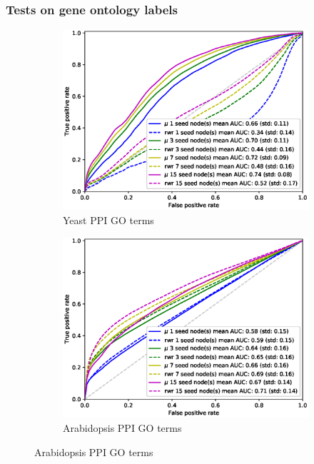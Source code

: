 \documentclass[sigconf]{acmart}
\begin{document}
\subsubsection{Tests on gene ontology labels}
\begin{figure}[]
     \centering
    \begin{subfigure}[b]{0.31\textwidth}
        \centering
        \includegraphics[width=\textwidth]{images/rocs/yeast_ppi_amigo.eps}
        \caption{Yeast PPI GO terms}
    \end{subfigure}
    \begin{subfigure}[b]{0.31\textwidth}
        \centering
        \includegraphics[width=\textwidth]{images/rocs/arabidopsis_ppi_amigo.eps}
        \caption{Arabidopsis PPI GO terms}

\end{subfigure}
\end{figure}
\end{document}
